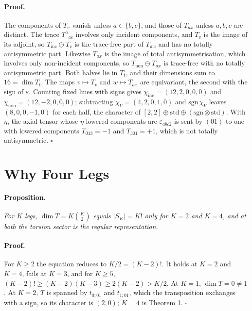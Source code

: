 \documentclass[twocolumn]{iopjournal}
\newcommand{\sgn}{\mathrm{sgn}}
\newcommand{\std}{\mathrm{std}}
\begin{document}
\paragraph{Proof.} The components of $T_v$ vanish unless
$a \in \{b,c\}$, and those of $T_{ax}$ unless $a, b, c$ are
distinct. The trace $T^a{}_{ac}$ involves only incident components,
and $T_v$ is the image of its adjoint, so $T_{\mathrm{inc}} \ominus
T_v$ is the trace-free part of $T_{\mathrm{inc}}$ and has no totally
antisymmetric part. Likewise $T_{ax}$ is the image of total
antisymmetrisation, which involves only non-incident components, so
$T_{\mathrm{non}} \ominus T_{ax}$ is trace-free with no totally
antisymmetric part. Both halves lie in $T_t$, and their dimensions
sum to $16 = \dim T_t$. The maps $v \mapsto T_v$ and
$w \mapsto T_{ax}$ are equivariant, the second with the sign of
$\varepsilon$. Counting fixed lines with signs gives
$\chi_{\mathrm{inc}} = (12, 2, 0, 0, 0)$ and
$\chi_{\mathrm{non}} = (12, -2, 0, 0, 0)$; subtracting
$\chi_V = (4, 2, 0, 1, 0)$ and $\sgn\,\chi_V$ leaves
$(8, 0, 0, -1, 0)$ for each half, the character of
$[2,2] \oplus \std \oplus (\sgn \otimes \std)$. With $\eta$, the
axial tensor whose $\eta$-lowered components are
$\varepsilon_{abc2}$ is sent by $(01)$ to one with lowered components
$T_{013} = -1$ and $T_{301} = +1$, which is not totally
antisymmetric. \hfill $\square$


\section*{Why Four Legs}

\paragraph{Proposition.} \textit{For $K$ legs,
$\dim T = K\binom{K}{2}$ equals $|S_K| = K!$ only for $K = 2$ and
$K = 4$, and at both the torsion sector is the regular
representation.}

\paragraph{Proof.} For $K \ge 2$ the equation reduces to
$K/2 = (K-2)!$. It holds at $K = 2$ and $K = 4$, fails at $K = 3$,
and for $K \ge 5$,
$(K-2)! \ge (K-2)(K-3) \ge 2(K-2) > K/2$. At $K = 1$,
$\dim T = 0 \neq 1$. At $K = 2$, $T$ is spanned by $t_{0;01}$ and
$t_{1;01}$, which the transposition exchanges with a sign, so its
character is $(2, 0)$; $K = 4$ is Theorem 1. \hfill $\square$
\end{document}
